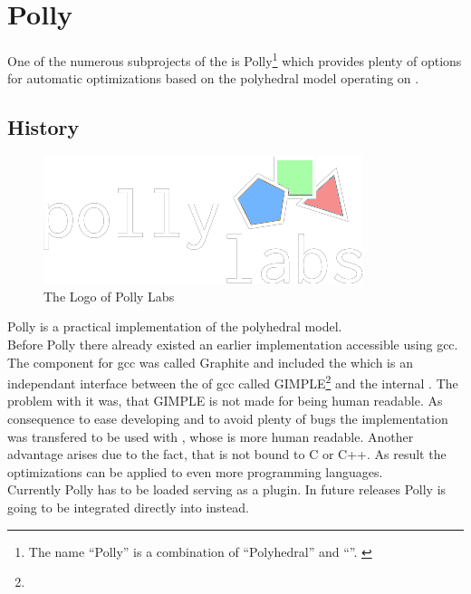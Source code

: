 \chapter{Polly}
One of the numerous subprojects of the \llvm is Polly\footnote{The name \enquote{Polly} is a combination of \enquote{Polyhedral} and \enquote{\llvm}. \cite{PollyGrosser}} which provides plenty of options for automatic optimizations based on the polyhedral model operating on \llvmir.

\section{History}
\begin{figure}
    \caption[The logo of Polly Labs]{The Logo of Polly Labs \cite{PollyLabsLogo}}
    \includegraphics[width=.5\textwidth]{gfx/pollylabs.png}
\end{figure}
Polly is a practical implementation of the polyhedral model.\\
Before Polly there already existed an earlier implementation accessible using gcc.
The component for gcc was called Graphite and included the \pcp which is an independant interface between the \ir of gcc called GIMPLE\footnote{} and the internal \ir \gpoly . \cite{GrosserGraphite, gccGimple, gccGraphite} 
The problem with it was, that GIMPLE is not made for being human readable.
As consequence to ease developing and to avoid plenty of bugs the implementation was transfered to be used with \llvm, whose \ir is more human readable.
Another advantage arises due to the fact, that \llvm is not bound to C or C++.
As result the optimizations can be applied to even more programming languages. \\
Currently Polly has to be loaded serving as a \llvm plugin.
In future releases Polly is going to be integrated directly into \llvm instead.

